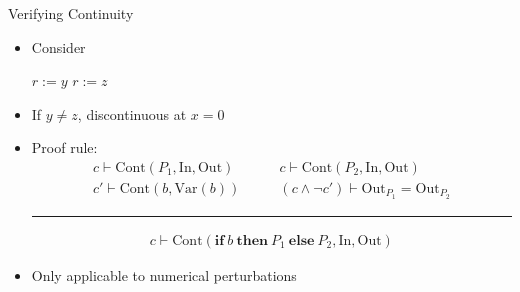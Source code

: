 \documentclass[usenames,dvipsnames]{beamer}
\begin{document}
\begin{frame}[fragile]{Verifying Continuity \cite{chaudhuri10}}
    \begin{itemize}
        \item<1-> Consider
            \begin{algorithmic}[1]
                    \State \(r := y\)
                \Else
                    \State \(r := z\)
                \EndIf
            \end{algorithmic}
        \item<2-> If \(y \not= z\), discontinuous at \(x = 0\)
        \item<3-> Proof rule:
            \begin{align*}
                c \vdash \mathrm{Cont}(P_{1}, \mathrm{In}, \mathrm{Out}) &\qquad c \vdash \mathrm{Cont}(P_{2}, \mathrm{In}, \mathrm{Out})\\
                c' \vdash \mathrm{Cont}(b, \mathrm{Var}(b)) &\qquad (c \wedge \neg c') \vdash \mathrm{Out}_{P_{1}} = \mathrm{Out}_{P_{2}}
            \end{align*}
            \vspace{-2\baselineskip}
            \begin{center}
                \rule{0.85\textwidth}{0.5pt}
            \end{center}
            \vspace{-0.75\baselineskip}
            \begin{align*}
                c \vdash \mathrm{Cont}(\mathbf{if}\: b\: \mathbf{then}\: P_{1}\: \mathbf{else}\: P_{2}, \mathrm{In}, \mathrm{Out})
            \end{align*}
        \item<4-> Only applicable to numerical perturbations
    \end{itemize}
\end{frame}
\end{document}
